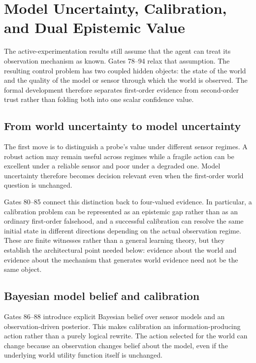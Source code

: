 \section{Model Uncertainty, Calibration, and Dual Epistemic Value}

The active-experimentation results still assume that the agent can treat its observation mechanism as known. Gates 78--94 relax that assumption. The resulting control problem has two coupled hidden objects: the state of the world and the quality of the model or sensor through which the world is observed. The formal development therefore separates first-order evidence from second-order trust rather than folding both into one scalar confidence value.

\subsection{From world uncertainty to model uncertainty}

The first move is to distinguish a probe's value under different sensor regimes. A robust action may remain useful across regimes while a fragile action can be excellent under a reliable sensor and poor under a degraded one. Model uncertainty therefore becomes decision relevant even when the first-order world question is unchanged.

Gates 80--85 connect this distinction back to four-valued evidence. In particular, a calibration problem can be represented as an epistemic gap rather than as an ordinary first-order falsehood, and a successful calibration can resolve the same initial state in different directions depending on the actual observation regime. These are finite witnesses rather than a general learning theory, but they establish the architectural point needed below: evidence about the world and evidence about the mechanism that generates world evidence need not be the same object.

\subsection{Bayesian model belief and calibration}

Gates 86--88 introduce explicit Bayesian belief over sensor models and an observation-driven posterior. This makes calibration an information-producing action rather than a purely logical rewrite. The action selected for the world can change because an observation changes belief about the model, even if the underlying world utility function itself is unchanged.

